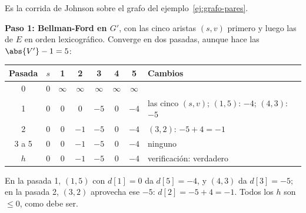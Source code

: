 \documentclass[11pt,letterpaper]{article}
\begin{document}
\begin{ejemplo}
  \label{ej:johnson-cormen}
  Es la corrida de Johnson sobre el grafo del
  ejemplo~\ref{ej:grafo-pares}.

  \textbf{Paso 1: Bellman-Ford en $G'$}, con las cinco aristas
  $(s, v)$ primero y luego las de $E$ en orden lexicográfico. Converge
  en dos pasadas, aunque hace las $\abs{V'} - 1 = 5$:
  \begin{center}
  \small
  \begin{tabular}{cccccccl}
    \toprule
    \textbf{Pasada} & $s$ & 1 & 2 & 3 & 4 & 5 & \textbf{Cambios} \\
    \midrule
    0 & $0$ & $\infty$ & $\infty$ & $\infty$ & $\infty$ & $\infty$ & \\
    1 & $0$ & $0$ & $0$ & $-5$ & $0$ & $-4$
      & las cinco $(s, v)$; $(1, 5)$: $-4$; $(4, 3)$: $-5$ \\
    2 & $0$ & $0$ & $-1$ & $-5$ & $0$ & $-4$ & $(3, 2)$: $-5 + 4 = -1$ \\
    3 a 5 & $0$ & $0$ & $-1$ & $-5$ & $0$ & $-4$ & ninguno \\
    \midrule
    $h$ & $0$ & $0$ & $-1$ & $-5$ & $0$ & $-4$
      & verificación: verdadero \\
    \bottomrule
  \end{tabular}
  \end{center}
  En la pasada 1, $(1, 5)$ con $d[1] = 0$ da $d[5] = -4$, y $(4, 3)$
  da $d[3] = -5$; en la pasada 2, $(3, 2)$ aprovecha ese $-5$:
  $d[2] = -5 + 4 = -1$. Todos los $h$ son $\le 0$, como debe ser.


\end{ejemplo}
\end{document}
